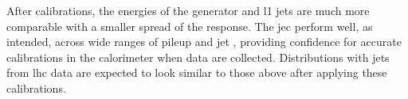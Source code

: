 After calibrations, the energies of the generator and \acrshort{l1} \glspl{jet} are much more comparable with a smaller spread of the response. The \acrlong{jec} perform well, as intended, across wide ranges of pileup and \gls{jet} \pt, providing confidence for accurate calibrations in the calorimeter when data are collected. Distributions with \glspl{jet} from \acrshort{lhc} data are expected to look similar to those above after applying these calibrations.
